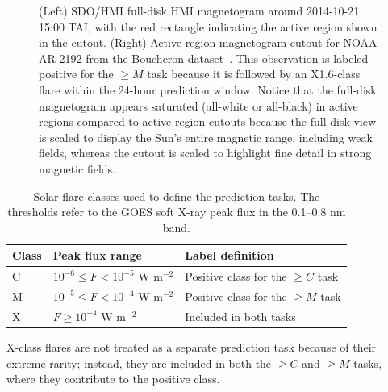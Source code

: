 \begin{figure}[H]
\centering
\begin{minipage}{0.47\textwidth}
\centering
{}
\end{minipage}
\hfill
\begin{minipage}{0.47\textwidth}
\centering
{}
\end{minipage}
\caption{(Left) SDO/HMI full-disk HMI magnetogram around 2014-10-21 15:00 TAI, with the red rectangle indicating the active region shown in the cutout. (Right) Active-region magnetogram cutout for NOAA AR 2192 from the Boucheron dataset~\cite{ref_boucheron}. This observation is labeled positive for the $\geq M$ task because it is followed by an X1.6-class flare within the 24-hour prediction window. Notice that the full-disk magnetogram appears saturated (all-white or all-black) in active regions compared to active-region cutouts because the full-disk view is scaled to display the Sun's entire magnetic range, including weak fields, whereas the cutout is scaled to highlight fine detail in strong magnetic fields.}
\label{fig:intro_solar_context}
\end{figure}



\begin{table}[H]
\centering
\caption{Solar flare classes used to define the prediction tasks. The thresholds refer to the GOES soft X-ray peak flux in the 0.1--0.8 nm band.}
\label{tab:intro_flare_classes}
\small
\renewcommand{\arraystretch}{1.15}
\begin{tabular}{@{}lll@{}}
\toprule
Class & Peak flux range & Label definition \\
\midrule
C & $10^{-6} \leq F < 10^{-5}$ W m$^{-2}$ & Positive class for the $\geq C$ task \\
M & $10^{-5} \leq F < 10^{-4}$ W m$^{-2}$ & Positive class for the $\geq M$ task \\
X & $F \geq 10^{-4}$ W m$^{-2}$ & Included in both tasks \\
\bottomrule
\end{tabular}
\end{table}

X-class flares are not treated as a separate prediction task because of their extreme rarity; instead, they are included in both the $\geq C$ and $\geq M$ tasks, where they contribute to the positive class.

